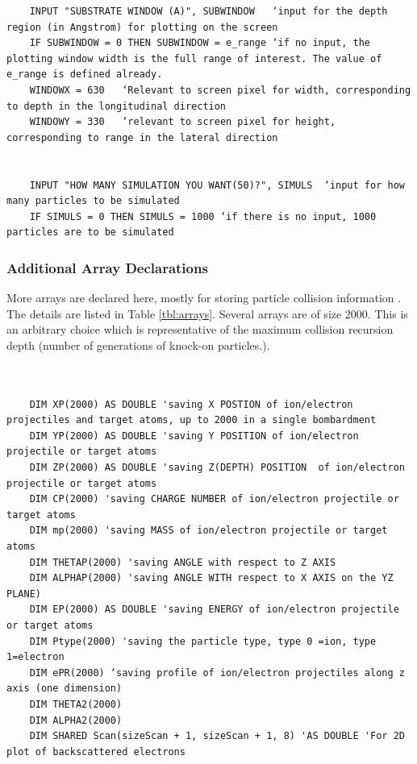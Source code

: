 \documentclass[10pt, reqno]{exam}
\begin{document}
\begin{verbatim}
    INPUT "SUBSTRATE WINDOW (A)", SUBWINDOW   ‘input for the depth region (in Angstrom) for plotting on the screen
    IF SUBWINDOW = 0 THEN SUBWINDOW = e_range ‘if no input, the plotting window width is the full range of interest. The value of e_range is defined already. 
    WINDOWX = 630   ‘Relevant to screen pixel for width, corresponding to depth in the longitudinal direction
    WINDOWY = 330   ‘relevant to screen pixel for height, corresponding to range in the lateral direction
    
    
    INPUT "HOW MANY SIMULATION YOU WANT(50)?", SIMULS  ‘input for how many particles to be simulated
    IF SIMULS = 0 THEN SIMULS = 1000 ‘if there is no input, 1000 particles are to be simulated
\end{verbatim}
\subsubsection{Additional Array Declarations}

More arrays are declared here, mostly for storing particle collision information        . The details are listed in Table \ref{tbl:arrays}. Several arrays are of size 2000. This is an arbitrary choice which is representative of the maximum collision recursion depth (number of generations of knock-on particles.). 

\begin{verbatim}

    
    DIM XP(2000) AS DOUBLE 'saving X POSTION of ion/electron projectiles and target atoms, up to 2000 in a single bombardment
    DIM YP(2000) AS DOUBLE 'saving Y POSITION of ion/electron projectile or target atoms
    DIM ZP(2000) AS DOUBLE 'saving Z(DEPTH) POSITION  of ion/electron projectile or target atoms
    DIM CP(2000) 'saving CHARGE NUMBER of ion/electron projectile or target atoms
    DIM mp(2000) 'saving MASS of ion/electron projectile or target atoms
    DIM THETAP(2000) 'saving ANGLE with respect to Z AXIS
    DIM ALPHAP(2000) 'saving ANGLE WITH respect to X AXIS on the YZ PLANE)
    DIM EP(2000) AS DOUBLE 'saving ENERGY of ion/electron projectile or target atoms
    DIM Ptype(2000) 'saving the particle type, type 0 =ion, type 1=electron
    DIM ePR(2000) ‘saving profile of ion/electron projectiles along z axis (one dimension) 
    DIM THETA2(2000)
    DIM ALPHA2(2000)
    DIM SHARED Scan(sizeScan + 1, sizeScan + 1, 8) 'AS DOUBLE 'For 2D plot of backscattered electrons
\end{verbatim}
\end{document}
